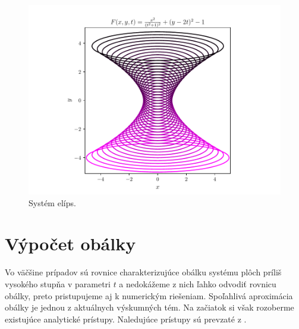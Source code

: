 \begin{figure}[H]
	\centering
	\includegraphics[trim={0 0.35cm 0 0.85cm},clip]{images/too_complicated_equations.pdf}
	\caption{Systém elíps.}
	\label{fig:too_complicated_equations}
\end{figure}

\section{Výpočet obálky}
Vo väčšine prípadov sú rovnice charakterizujúce obálku systému plôch príliš vysokého stupňa v parametri $t$ a nedokážeme z nich ľahko odvodiť rovnicu obálky, preto pristupujeme aj k numerickým riešeniam. Spoľahlivá aproximácia obálky je jednou z aktuálnych výskumných tém. Na začiatok si však rozoberme existujúce analytické prístupy. Naledujúce prístupy sú prevzaté z \cite{Vra22}.
